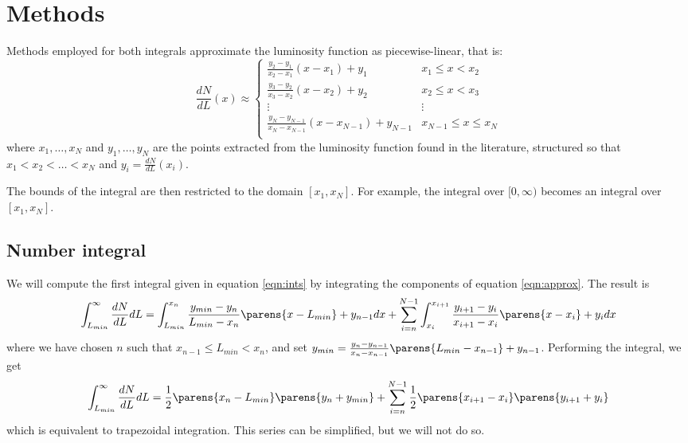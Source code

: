 \documentclass{C://Aliases//Dropbox-MIT//Latex_Templates//personal}
\begin{document}
\section{Methods}
Methods employed for both integrals approximate the luminosity function as piecewise-linear, that is:
\begin{equation}
\frac{dN}{dL}(x) \approx \begin{cases}
    \frac{y_2 - y_1}{x_2 - x_1}(x - x_1) + y_1 & x_1 \leq x < x_2 \\
    \frac{y_3 - y_2}{x_3 - x_2}(x - x_2) + y_2 & x_2 \leq x < x_3 \\
    \vdots & \vdots \\
    \frac{y_N - y_{N-1}}{x_N - x_{N-1}}(x - x_{N-1}) + y_{N-1} & x_{N-1} \leq x \leq x_{N} \\
    \label{eqn:approx}
\end{cases}
\end{equation}
where $x_1,\dots, x_N$ and $y_1,\dots, y_N$ are the points extracted from the luminosity function found in the literature, structured so that $x_1 < x_2 < \dots < x_N$ and $y_i = \frac{dN}{dL}(x_i)$.

The bounds of the integral are then restricted to the domain $[x_1, x_N]$. For example, the integral over $[0, \infty)$ becomes an integral over $[x_1, x_N]$.

\subsection{Number integral}
We will compute the first integral given in equation \ref{eqn:ints} by integrating the components of equation \ref{eqn:approx}. The result is
\begin{equation*}
    \int_{L_{min}}^\infty \frac{dN}{dL}dL = \int_{L_{min}}^{x_{n}}\frac{y_{min} - y_n}{L_{min} - x_n}\parens{x - L_{min}} + y_{n-1} dx + \sum_{i = n}^{N-1}\int_{x_i}^{x_{i+1}}\frac{y_{i+1} - y_i}{x_{i+1} - x_i}\parens{x - x_i} + y_i dx
\end{equation*}
where we have chosen $n$ such that $x_{n-1} \leq L_{min} < x_n$, and set $y_{min} = \frac{y_{n} - y_{n-1}}{x_{n} - x_{n-1}}\parens{L_{min} - x_{n-1}} + y_{n-1}$. Performing the integral, we get
\begin{equation}
    \int_{L_{min}}^\infty \frac{dN}{dL}dL = \frac{1}{2} \parens{x_n - L_{min}}\parens{y_n + y_{min}} + \sum_{i=n}^{N-1}\frac{1}{2} \parens{x_{i+1} - x_i}\parens{y_{i+1} + y_{i}}
\end{equation}
which is equivalent to trapezoidal integration. This series can be simplified, but we will not do so.
\end{document}
